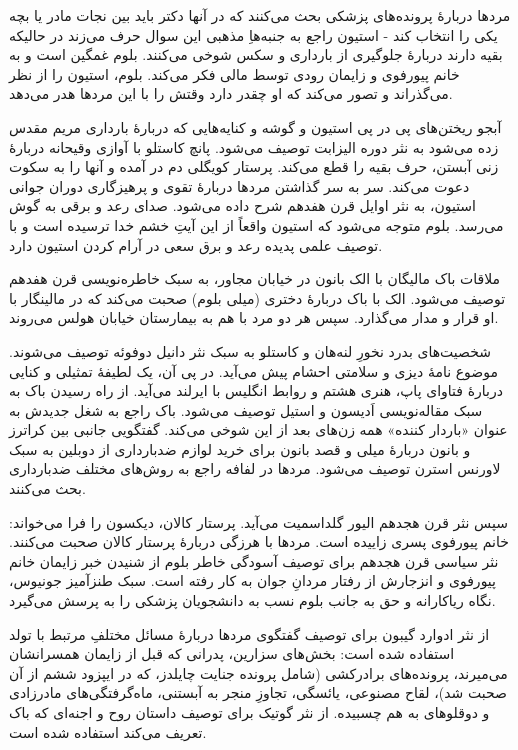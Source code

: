 \documentclass[12pt]{book}
\begin{document}
    مردها دربارۀ پرونده‌های پزشکی بحث می‌کنند که در آنها دکتر باید بین نجات مادر یا بچه یکی را انتخاب کند - استیون راجع به جنبه‌هاِ مذهبی این سوال حرف می‌زند در حالیکه بقیه دارند دربارۀ جلوگیری از بارداری و سکس شوخی می‌کنند. بلوم غمگین است و به خانم پیورفوی و زایمان رودی توسط مالی فکر می‌کند. بلوم، استیون را از نظر می‌گذراند و تصور می‌کند که او چقدر دارد وقتش را با این مردها هدر می‌دهد.

    آبجو ریختن‌های پی در پی استیون و گوشه و کنایه‌هایی که دربارۀ بارداری مریم مقدس زده می‌شود به نثر دوره الیزابت توصیف می‌شود. پانچ کاستلو با آوازی وقیحانه دربارۀ زنی آبستن، حرف بقیه را قطع می‌کند. پرستار کویگلی دم در آمده و آنها را به سکوت دعوت می‌کند. سر به سر گذاشتن مردها دربارۀ تقوی و پرهیزگاری دوران جوانی استیون، به نثر اوایل قرن هفدهم شرح داده می‌شود. صدای رعد و برقی به گوش می‌رسد. بلوم متوجه می‌شود که استیون واقعاً از این آیتِ خشم خدا ترسیده است و با توصیف علمی پدیده رعد و برق سعی در آرام کردن استیون دارد.

    ملاقات باک مالیگان با الک بانون در خیابان مجاور، به سبک خاطره‌نویسی قرن هفدهم توصیف می‌شود. الک با باک دربارۀ دختری (میلی بلوم) صحبت می‌کند که در مالینگار با او قرار و مدار می‌گذارد. سپس هر دو مرد با هم به بیمارستان خیابان هولس می‌روند.

    شخصیت‌های بدرد نخورِ لنه‌هان و کاستلو به سبک نثر دانیل دوفوئه توصیف می‌شوند. موضوع نامۀ دیزی و سلامتی احشام پیش می‌آید. در پی آن، یک لطیفۀ تمثیلی و کنایی دربارۀ فتاوای پاپ، هنری هشتم و روابط انگلیس با ایرلند می‌آید. از راه رسیدن باک به سبک مقاله‌نویسی اَدیسون و استیل توصیف می‌شود. باک راجع به شغل جدیدش به عنوان «باردار کننده» همه زن‌های بعد از این شوخی می‌کند. گفتگویی جانبی بین کراترز و بانون دربارۀ میلی و قصد بانون برای خرید لوازم ضدبارداری از دوبلین به سبک لاورنس استرن توصیف می‌شود. مردها در لفافه راجع به روش‌های مختلف ضدبارداری بحث می‌کنند.

    سپس نثر قرن هجدهم الیور گلداسمیت می‌آید. پرستار کالان، دیکسون را فرا می‌خواند: خانم پیورفوی پسری زاییده است. مردها با هرزگی دربارۀ پرستار کالان صحبت می‌کنند. نثر سیاسی قرن هجدهم برای توصیف آسودگی خاطر بلوم از شنیدن خبر زایمان خانم پیورفوی و انزجارش از رفتار مردانِ جوان به کار رفته است. سبک طنزآمیز جونیوس، نگاه ریاکارانه و حق به جانب بلوم نسب به دانشجویان پزشکی را به پرسش می‌گیرد.

    از نثر ادوارد گیبون برای توصیف گفتگوی مردها دربارۀ مسائل مختلفِ مرتبط با تولد استفاده شده است: بخش‌های سزارین، پدرانی که قبل از زایمان همسرانشان می‌میرند، پرونده‌های برادرکشی (شامل پرونده جنایت چایلدز، که در ایپزود ششم از آن صحبت شد)، لقاح مصنوعی، یائسگی، تجاوزِ منجر به آبستنی، ماه‌گرفتگی‌های مادرزادی و دوقلوهای به هم چسبیده. از نثر گوتیک برای توصیف داستان روح و اجنه‌ای که باک تعریف می‌کند استفاده شده است.
\end{document}
